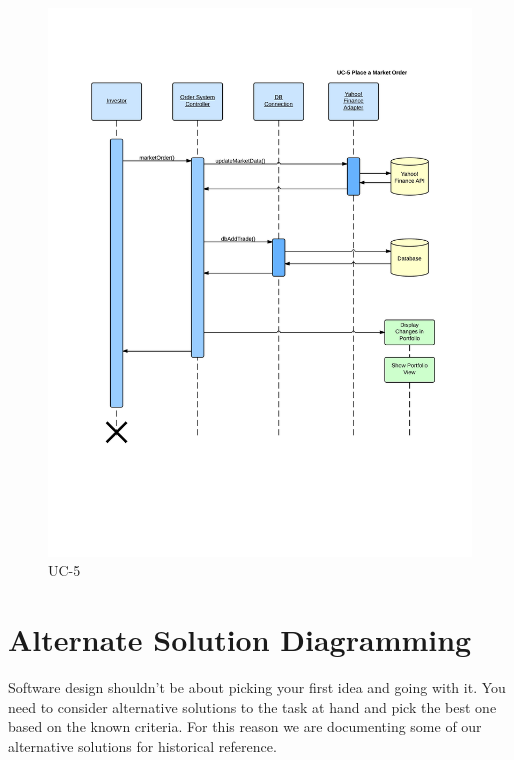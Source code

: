 \begin{figure}[H]
\centering
\includegraphics[width=5.5in]{./img/inter/uc5.jpg}
\caption{UC-5}
\end{figure}


\section{Alternate Solution Diagramming}

Software design shouldn't be about picking your first idea and going with it.
You need to consider alternative solutions to the task at hand and pick the best
one based on the known criteria.  For this reason we are documenting some of
our alternative solutions for historical reference.\\

